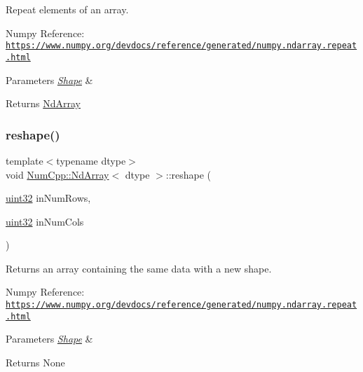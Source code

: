 Repeat elements of an array.

Numpy Reference\+: \href{https://www.numpy.org/devdocs/reference/generated/numpy.ndarray.repeat.html}{\tt https\+://www.\+numpy.\+org/devdocs/reference/generated/numpy.\+ndarray.\+repeat.\+html}


\begin{DoxyParams}{Parameters}
{\em \mbox{\hyperlink{class_num_cpp_1_1_shape}{Shape}}} & \\
\hline
\end{DoxyParams}
\begin{DoxyReturn}{Returns}
\mbox{\hyperlink{class_num_cpp_1_1_nd_array}{Nd\+Array}} 
\end{DoxyReturn}
\mbox{\label{class_num_cpp_1_1_nd_array_a3693817306a5eb45321cc922d7fc9d4c}} 
\subsubsection{\texorpdfstring{reshape()}{reshape()}\hspace{0.1cm}{\footnotesize\ttfamily [1/2]}}
{\footnotesize\ttfamily template$<$typename dtype$>$ \\
void \mbox{\hyperlink{class_num_cpp_1_1_nd_array}{Num\+Cpp\+::\+Nd\+Array}}$<$ dtype $>$\+::reshape (\begin{DoxyParamCaption}\item[{\mbox{\hyperlink{namespace_num_cpp_a36f388e948380413c63011cab9b7fbd5}{uint32}}}]{in\+Num\+Rows,  }\item[{\mbox{\hyperlink{namespace_num_cpp_a36f388e948380413c63011cab9b7fbd5}{uint32}}}]{in\+Num\+Cols }\end{DoxyParamCaption})\hspace{0.3cm}{\ttfamily [inline]}}

Returns an array containing the same data with a new shape.

Numpy Reference\+: \href{https://www.numpy.org/devdocs/reference/generated/numpy.ndarray.repeat.html}{\tt https\+://www.\+numpy.\+org/devdocs/reference/generated/numpy.\+ndarray.\+repeat.\+html}


\begin{DoxyParams}{Parameters}
{\em \mbox{\hyperlink{class_num_cpp_1_1_shape}{Shape}}} & \\
\hline
\end{DoxyParams}
\begin{DoxyReturn}{Returns}
None 
\end{DoxyReturn}
\mbox{\label{class_num_cpp_1_1_nd_array_a13b99166ade55b455abf4b2112d246bc}} 
